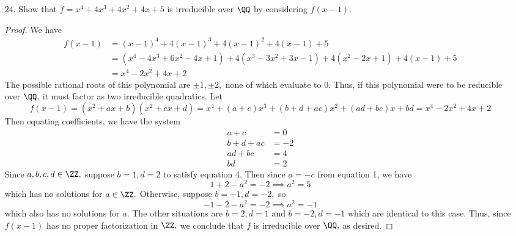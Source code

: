 \documentclass{article}
\begin{document}
\begin{itemize}
	\item[24.] Show that $f=x^4+4x^3+4x^2+4x+5$ is irreducible over $\QQ$ by considering $f(x-1).$
		\begin{proof}
			We have 
			\begin{align*}
				f(x-1) &= (x-1)^4+4(x-1)^3+4(x-1)^2+4(x-1)+5 \\
				&= (x^4-4x^3+6x^2-4x+1) + 4(x^3-3x^2+3x-1) + 4(x^2-2x+1)+ 4(x-1)+5 \\
				&= x^4-2x^2+4x+2
			\end{align*}
			The possible rational roots of this polynomial are $\pm1, \pm2,$ none of which evaluate to 0. Thus, if this polynomial were to be reducible over $\QQ,$ it must factor as two irreducible quadratics. Let \[f(x-1)=(x^2+ax+b)(x^2+cx+d)=x^4+(a+c)x^3+(b+d+ac)x^2+(ad+bc)x+bd = x^4-2x^2+4x+2\] Then equating coefficients, we have the system
			\begin{align*}
				a+c &= 0 \\
				b+d+ac &= -2 \\
				ad+bc &= 4 \\
				bd &= 2
			\end{align*}
			Since $a, b, c, d\in \ZZ,$ suppose $b=1, d=2$ to satisfy equation 4. Then since $a=-c$ from equation 1, we have \[1+2-a^2=-2 \implies a^2=5\] which has no solutions for $a\in \ZZ.$ Otherwise, suppose $b=-1, d=-2,$ so \[-1-2-a^2=-2\implies a^2=-1\] which also has no solutions for $a.$ The other situations are $b=2, d=1$ and $b=-2, d=-1$ which are identical to this case. Thus, since $f(x-1)$ has no proper factorization in $\ZZ,$ we conclude that $f$ is irreducible over $\QQ,$ as desired.
			
		\end{proof}
		
\end{itemize}
\end{document}
